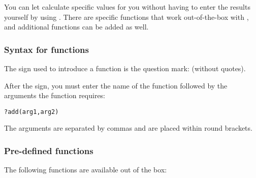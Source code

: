 
You can let \app{} calculate specific values for you without having to enter the results yourself by using . There are specific functions that work out-of-the-box with \app{}, and additional functions can be added as well. 

\subsubsection{Syntax for functions}
The sign used to introduce a function is the question mark:  (without quotes). 

After the sign, you must enter the name of the function followed by the arguments the function requires:

\verb+?add(arg1,arg2)+

The arguments are separated by commas and are placed within round brackets. 

\subsubsection{Pre-defined functions}
The following functions are available out of the box:

